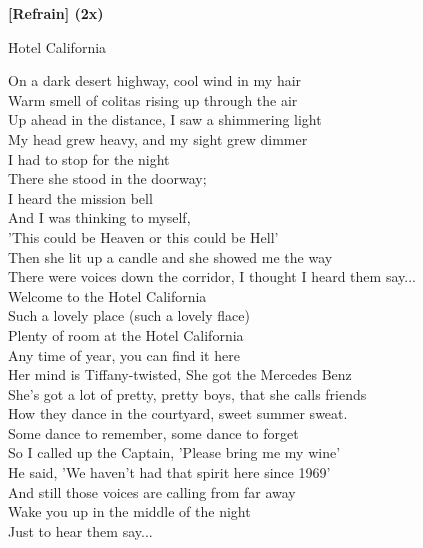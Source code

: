 \documentclass{novel}
\begin{document}
{{\begin{minipage}[t][0.4\textheight][t]{\textwidth}
\begin{multicols}{2}
\textbf{[Refrain] (2x)}

\end{multicols}
\end{minipage}

\nointerlineskip
\begin{minipage}[b][0.55\textheight][t]{\textwidth}
\vspace{0.1\textheight}
\h*{Hotel California}

\begin{multicols}{2}
On a dark desert highway, cool wind in my hair\\
Warm smell of colitas rising up through the air\\
Up ahead in the distance, I saw a shimmering light\\
My head grew heavy, and my sight grew dimmer\\
I had to stop for the night\\
There she stood in the doorway;\\
I heard the mission bell\\
And I was thinking to myself,\\
'This could be Heaven or this could be Hell'\\
Then she lit up a candle and she showed me the way\\
There were voices down the corridor, I thought I heard them say...\\

Welcome to the Hotel California\\
Such a lovely place (such a lovely flace)\\
Plenty of room at the Hotel California\\
Any time of year, you can find it here\\

Her mind is Tiffany-twisted, She got the Mercedes Benz\\
She's got a lot of pretty, pretty boys, that she calls friends\\
How they dance in the courtyard, sweet summer sweat.\\
Some dance to remember, some dance to forget\\
So I called up the Captain, 'Please bring me my wine'\\
He said, 'We haven't had that spirit here since 1969'\\
And still those voices are calling from far away\\
Wake you up in the middle of the night\\
Just to hear them say...\\


\end{multicols}
\end{minipage}}}
\end{document}
